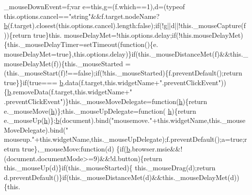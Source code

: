 \begin{DoxyCode}
      \_mouseDownEvent=f;var e=\textcolor{keyword}{this},g=(f.which==1),d=(typeof this.options.cancel==\textcolor{stringliteral}{"string"}&&f.target.nodeName?
      \hyperlink{jquery_8js_aa4026ad5544b958e54ce5e106fa1c805}{b}(f.target).closest(this.options.cancel).length:\textcolor{keyword}{false});\textcolor{keywordflow}{if}(!g||d||!this.\_mouseCapture(f))\{\textcolor{keywordflow}{return} \textcolor{keyword}{true}\}this.
      mouseDelayMet=!this.options.delay;\textcolor{keywordflow}{if}(!this.mouseDelayMet)\{this.\_mouseDelayTimer=setTimeout(\textcolor{keyword}{function}()\{e.
      mouseDelayMet=\textcolor{keyword}{true}\},this.options.delay)\}\textcolor{keywordflow}{if}(this.\_mouseDistanceMet(f)&&this.\_mouseDelayMet(f))\{this.\_mouseStarted
      =(this.\_mouseStart(f)!==\textcolor{keyword}{false});\textcolor{keywordflow}{if}(!this.\_mouseStarted)\{f.preventDefault();\textcolor{keywordflow}{return} \textcolor{keyword}{true}\}\}\textcolor{keywordflow}{if}(\textcolor{keyword}{true}===
      \hyperlink{jquery_8js_aa4026ad5544b958e54ce5e106fa1c805}{b}.data(f.target,\textcolor{keyword}{this}.widgetName+\textcolor{stringliteral}{".preventClickEvent"}))\{\hyperlink{jquery_8js_aa4026ad5544b958e54ce5e106fa1c805}{b}.removeData(f.target,\textcolor{keyword}{this}.widgetName+\textcolor{stringliteral}{"
      .preventClickEvent"})\}this.\_mouseMoveDelegate=\textcolor{keyword}{function}(\hyperlink{all__1a_8js_aebecdaf2444e2be39f4804412d6a3bf8}{h})\{\textcolor{keywordflow}{return} e.\_mouseMove(\hyperlink{all__1a_8js_aebecdaf2444e2be39f4804412d6a3bf8}{h})\};this.\_mouseUpDelegate=\textcolor{keyword}{function}(
      \hyperlink{all__1a_8js_aebecdaf2444e2be39f4804412d6a3bf8}{h})\{\textcolor{keywordflow}{return} e.\_mouseUp(\hyperlink{all__1a_8js_aebecdaf2444e2be39f4804412d6a3bf8}{h})\};\hyperlink{jquery_8js_aa4026ad5544b958e54ce5e106fa1c805}{b}(document).bind(\textcolor{stringliteral}{"mousemove."}+this.widgetName,this.\_mouseMoveDelegate).bind(\textcolor{stringliteral}{"
      mouseup."}+this.widgetName,this.\_mouseUpDelegate);f.preventDefault();a=\textcolor{keyword}{true};\textcolor{keywordflow}{return} \textcolor{keyword}{true}\},\_mouseMove:\textcolor{keyword}{function}(d)
      \{\textcolor{keywordflow}{if}(\hyperlink{jquery_8js_aa4026ad5544b958e54ce5e106fa1c805}{b}.browser.msie&&!(document.documentMode>=9)&&!d.button)\{\textcolor{keywordflow}{return} this.\_mouseUp(d)\}\textcolor{keywordflow}{if}(this.\_mouseStarted)\{
      this.\_mouseDrag(d);\textcolor{keywordflow}{return} d.preventDefault()\}\textcolor{keywordflow}{if}(this.\_mouseDistanceMet(d)&&this.\_mouseDelayMet(d))\{this.

\end{DoxyCode}
